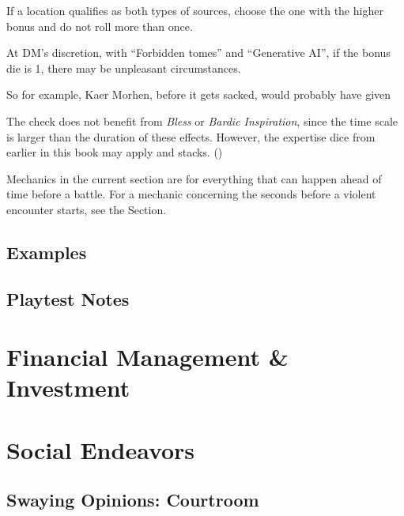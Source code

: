 \documentclass[twocolumn]{dndbook}
\begin{document}
If a location qualifies as both types of sources, choose the one with the higher bonus and do not roll more than once.\par

At DM's discretion, with ``Forbidden tomes'' and ``Generative AI'', if the bonus die is 1, there may be unpleasant circumstances.\par

So for example, Kaer Morhen, before it gets sacked, would probably have given \par

The check does not benefit from \emph{Bless} or \emph{Bardic Inspiration}, since the time scale is larger than the duration of these effects.
However, the expertise dice from earlier in this book may apply and stacks. ()\par


\begin{emphasisParagraph}
	Mechanics in the current section are for everything that can happen ahead of time before a battle.
	For a mechanic concerning the seconds before a violent encounter starts, see the  Section.\par
\end{emphasisParagraph}

\subsection{Examples}

\subsection{Playtest Notes}



\section{Financial Management \& Investment}


\section{Social Endeavors}
\subsection{Swaying Opinions: Courtroom}
\end{document}
